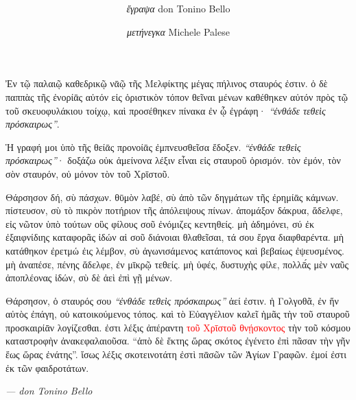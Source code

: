 \documentclass[a4paper, 12pt]{article}
\title{
	\Huge{\MyTitle}
}
\author{
	\textit{ἔγραψα} don Tonino Bello
	\and
	\textit{μετήνεγκα} Michele Palese
}
\date{}
\begin{document}
	\maketitle

	\begin{otherlanguage}{polytonicgreek}

    Ἐν τῷ παλαιῷ καθεδρικῷ νᾱῷ τῆς Μελφίκτης μέγας πήλινος σταυρός ἐστιν.
    ὁ δὲ παππὰς τῆς ἐνορίᾱς αὐτόν εἰς ὁριστικὸν τόπον θεῖναι μένων καθέθηκεν αὐτόν πρὸς τῷ τοῦ σκευοφυλάκιου τοίχῳ, καὶ προσέθηκεν πίνακα ἐν ᾧ ἐγράφη·
	\textit{``ἐνθάδε τεθεὶς πρόσκαιρως''}.
	
	Ἡ γραφή μοι ὑπὸ τῆς θείᾱς προνοίᾱς ἐμπνευσθεῖσα ἔδοξεν.
	\textit{``ἐνθάδε τεθεὶς πρόσκαιρως''}· δοξάζω οὐκ ἀμείνονα λέξιν εἶναι εἰς σταυροῦ ὁρισμόν.
	τὸν ἐμόν, τὸν σὸν σταυρόν, οὐ μόνον τὸν τοῦ Χρῑστοῦ.

	Θάρσησον δή, σὺ πάσχων.
	θῡμὸν λαβέ, σὺ ἀπὸ τῶν δηγμάτων τῆς ἐρημίᾱς κάμνων.
	πίστευσον, σὺ τὸ πικρὸν ποτήριον τῆς ἀπόλειψους πίνων.
	ἀπομάξον δάκρυα, ἄδελφε, εἰς νῶτον ὑπὸ τούτων οὓς φίλους σοῦ ἐνόμιζες κεντηθείς.
	μὴ ἀδημόνει, σύ ἐκ ἐξαιφνίδιης καταφορᾶς ἰδών αἱ σοῦ διάνοιαι θλαθεῖσαι, τά σου ἔργα διαφθαρέντα.
	μὴ κατάθηκον ἐρετμώ ἐις λέμβον, σὺ ἀγωνισάμενος κατάπονος καὶ βεβαίως ἐψευσμένος.
	μὴ ἀναπέσε, πένης ἄδελφε, ἐν μῑκρῷ τεθείς.
	μὴ ὑφές, δυστυχὴς φίλε, πολλᾱ́ς μὲν ναῦς ἀποπλέονας ἰδών, σὺ δὲ ἀεὶ ἐπὶ γῇ μένων.%

	Θάρσησον, ὁ σταυρός σου \textit{``ἐνθάδε τεθεὶς πρόσκαιρως''} ἀεί ἐστιν.
	ἡ Γολγοθᾶ, ἐν ἥν αὐτὸς ἐπάγη, οὐ κατοικούμενος τόπος.
	καὶ τὸ Εὐαγγέλιον καλεῖ ἡμᾶς τὴν τοῦ σταυροῦ προσκαιρίᾱν λογίζεσθαι.
	ἐστι λέξις ἀπέραντη \textcolor{red}{τοῦ Χρῑστοῦ θνῄσκοντος} τὴν τοῦ κόσμου καταστροφὴν ἀνακεφαλαιοῦσα.
	``ἀπὸ δὲ ἕκτης ὥρας σκότος ἐγένετο ἐπὶ πᾶσαν τὴν γῆν ἕως ὥρας ἐνάτης''.
	ἴσως λέξις σκοτεινοτάτη ἐστὶ πᾱσῶν τῶν Ἁγίων Γραφῶν.
	ἐμοί ἐστι ἐκ τῶν φαιδροτάτων.
	\end{otherlanguage}

	\bigskip
	\raggedleft \textit{--- don Tonino Bello} \hspace{1em}
\end{document}

